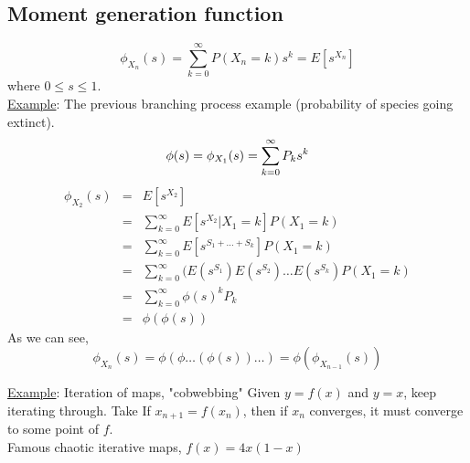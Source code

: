   \subsection*{Moment generation function}
    $$
      \phi_{X_n}(s) = \sum_{k = 0}^{\infty} P(X_n = k) s^k = 
        E[s^{X_n}]
    $$
    where $0 \le s \le 1$.\\
    \underline{Example}: The previous branching process example
      (probability of species going extinct).\\
    $$
      \phi(s) = \phi_{X_1}(s)\\
        = \sum_{k = 0}^{\infty}P_k s^k
    $$
    \begin{eqnarray*}
      \phi_{X_2}(s) & = & E[s^{X_2}]\\
        & = & \sum_{k = 0}^{\infty} E[s^{X_2} | X_1 = k] P(X_1 = k)\\
        & = & \sum_{k = 0}^{\infty} E[s^{S_1 + \ldots + S_k}]
          P(X_1 = k)\\
        & = & \sum_{k = 0}^{\infty}(E(s^{S_1})E(s^{S_2})\ldots 
          E(s^{S_k}) P(X_1 = k)\\
        & = & \sum_{k = 0}^{\infty} \phi(s)^k P_k\\
        & = & \phi(\phi(s))
    \end{eqnarray*}
    As we can see,
    $$
      \phi_{X_n}(s) = \phi(\phi\ldots (\phi(s)) \ldots ) = 
        \phi(\phi_{X_{n-1}}(s))
    $$

    \noindent\underline{Example}: Iteration of maps, "cobwebbing"
    Given $y = f(x)$ and $y = x$, keep iterating through. Take
    If $x_{n + 1} = f(x_n)$, then if $x_n$ converges, it must 
    converge to some point of $f$.\\
    Famous chaotic iterative maps, $f(x) = 4x(1 - x)$
